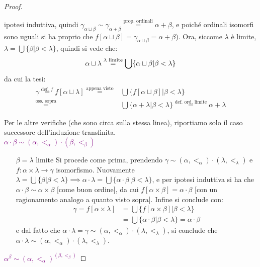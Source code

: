 \documentclass[11pt]{scrartcl}
\begin{document}
\begin{proof}
\begin{itemize}
		ipotesi induttiva, quindi $\gamma_{\alpha \sqcup \beta} \sim \gamma_{\alpha + \beta} \overset{\text{prop. ordinali}}{=} \alpha + \beta$, e poiché ordinali isomorfi sono uguali si ha proprio che $f[\alpha \sqcup \beta] = \gamma_{\alpha \sqcup \beta} = \alpha + \beta$).
		Ora, siccome $\lambda$ è limite, $\lambda = \bigcup \{\beta | \beta < \lambda\}$, quindi si vede che:
		\[ \alpha \sqcup \lambda \overset{\text{$\lambda$ limite}}{=} \bigcup \{\alpha \sqcup \beta | \beta < \lambda\} \\
			\]
		da cui la tesi:
		\[ \begin{split}
			\gamma \overset{\text{def. $f$}}{=} f[\alpha \sqcup \lambda] \overset{\text{appena visto}}{=}& \bigcup \{f[\alpha \sqcup \beta] | \beta < \lambda\} \\
																		 \overset{\text{oss. sopra}}{=}& \bigcup \{\alpha + \lambda | \beta < \lambda\} \overset{\text{def. ord. limite}}{=} \alpha + \lambda
		\end{split}
			\]
	\end{itemize}
	Per le altre verifiche (che sono circa sulla stessa linea), riportiamo solo il caso successore dell'induzione transfinita.\\
	\textcolor{purple}{$\alpha \cdot \beta \sim (\alpha,<_\alpha) \cdot (\beta,<_\beta)$}
	\begin{itemize}
		\item[$\boxed{\text{$\beta = \lambda$ limite}}$] Si procede come prima, prendendo $\gamma \sim (\alpha,<_\alpha) \cdot (\lambda,<_\lambda)$ e $f : \alpha \times \lambda \rightarrow \gamma$ isomorfismo.
		Nuovamente $\lambda = \bigcup \{\beta | \beta < \lambda\} \implies \alpha \cdot \lambda = \bigcup\{\alpha \cdot \beta | \beta < \lambda\}$, e per ipotesi induttiva si ha che $\alpha \cdot \beta \sim \alpha \times \beta$ [come buon ordine],
		da cui $f[\alpha \times \beta] = \alpha \cdot \beta$ [con un ragionamento analogo a quanto visto sopra]. Infine si conclude con:
		\[ \begin{split}
			\gamma = f[\alpha \times \lambda] &= \bigcup\{f[\alpha \times \beta] | \beta < \lambda\} \\
											  &= \bigcup\{\alpha \cdot \beta | \beta < \lambda\} = \alpha \cdot \beta
		\end{split}
			\]
		e dal fatto che $\alpha \cdot \lambda = \gamma \sim (\alpha,<_\alpha) \cdot (\lambda,<_\lambda)$, si conclude che $\alpha \cdot \lambda \sim (\alpha,<_\alpha) \cdot (\lambda,<_\lambda)$.
	\end{itemize}
	\textcolor{purple}{$\alpha^\beta \sim (\alpha,<_\alpha)^{(\beta,<_\beta)}$}

\end{proof}
\end{document}
